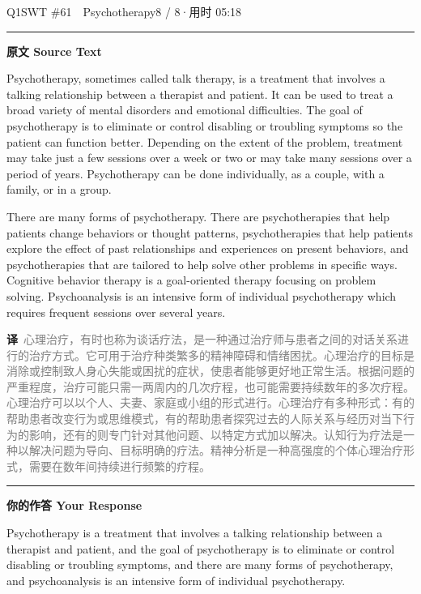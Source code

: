 \documentclass[11pt]{article}
\newcommand{\ptesub}[1]{%
  \par\needspace{2\baselineskip}\smallskip
  {\color{cAccent}\rule[-0.2ex]{3pt}{1.05em}}\hspace{6pt}%
  {\bfseries\color{cHead}#1}\par\nopagebreak\smallskip}
\newcommand{\zh}[1]{{\footnotesize\textcolor{cNote}{\textbf{译}}\ \textcolor{gray}{#1}}}
\begin{document}
\begin{qblock}{Q1\quad SWT \#61\ \ Psychotherapy}{8 / 8\quad·\quad 用时 05:18}

\ptesub{原文 Source Text}
\begin{promptbox}
Psychotherapy, sometimes called talk therapy, is a treatment that involves a talking relationship between a therapist and patient. It can be used to treat a broad variety of mental disorders and emotional difficulties. The goal of psychotherapy is to eliminate or control disabling or troubling symptoms so the patient can function better. Depending on the extent of the problem, treatment may take just a few sessions over a week or two or may take many sessions over a period of years. Psychotherapy can be done individually, as a couple, with a family, or in a group.

There are many forms of psychotherapy. There are psychotherapies that help patients change behaviors or thought patterns, psychotherapies that help patients explore the effect of past relationships and experiences on present behaviors, and psychotherapies that are tailored to help solve other problems in specific ways. Cognitive behavior therapy is a goal-oriented therapy focusing on problem solving. Psychoanalysis is an intensive form of individual psychotherapy which requires frequent sessions over several years.
\end{promptbox}
\zh{心理治疗，有时也称为谈话疗法，是一种通过治疗师与患者之间的对话关系进行的治疗方式。它可用于治疗种类繁多的精神障碍和情绪困扰。心理治疗的目标是消除或控制致人身心失能或困扰的症状，使患者能够更好地正常生活。根据问题的严重程度，治疗可能只需一两周内的几次疗程，也可能需要持续数年的多次疗程。心理治疗可以以个人、夫妻、家庭或小组的形式进行。心理治疗有多种形式：有的帮助患者改变行为或思维模式，有的帮助患者探究过去的人际关系与经历对当下行为的影响，还有的则专门针对其他问题、以特定方式加以解决。认知行为疗法是一种以解决问题为导向、目标明确的疗法。精神分析是一种高强度的个体心理治疗形式，需要在数年间持续进行频繁的疗程。}

\ptesub{你的作答 Your Response}
\begin{youbox}
Psychotherapy is a treatment that involves a talking relationship between a therapist and patient, and the goal of psychotherapy is to eliminate or control disabling or troubling symptoms, and there are many forms of psychotherapy, and psychoanalysis is an intensive form of individual psychotherapy.
\end{youbox}


\end{qblock}
\end{document}
